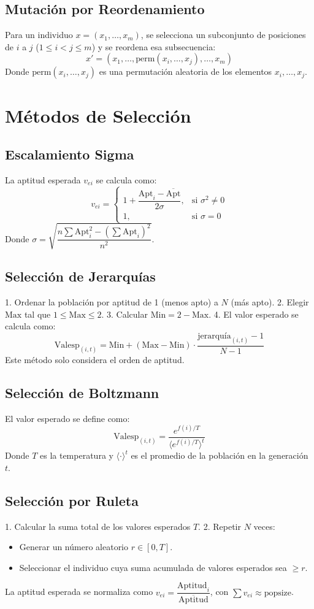 \documentclass[11pt, letterpaper]{article}
\begin{document}
	\subsection*{Mutación por Reordenamiento}
	Para un individuo $x = (x_1, \ldots, x_m)$, se selecciona un subconjunto de posiciones de $i$ a $j$ ($1 \leq i < j \leq m$) y se reordena esa subsecuencia:
	\[
	x' = (x_1, \ldots, \text{perm}(x_i, \ldots, x_j), \ldots, x_m)
	\]
	Donde $\text{perm}(x_i, \ldots, x_j)$ es una permutación aleatoria de los elementos $x_i, \ldots, x_j$.
	
	\section*{Métodos de Selección}
	
	\subsection*{Escalamiento Sigma}
	La aptitud esperada $v_{ei}$ se calcula como:
	\[
	v_{ei} =
	\begin{cases}
		1 + \dfrac{\text{Apt}_i - \overline{\text{Apt}}}{2\sigma}, & \text{si } \sigma^2 \neq 0 \\
		1, & \text{si } \sigma = 0
	\end{cases}
	\]
	Donde $\sigma = \sqrt{ \dfrac{n \sum \text{Apt}_i^2 - \left( \sum \text{Apt}_i \right)^2}{n^2} }$.
	
	\subsection*{Selección de Jerarquías}
	1. Ordenar la población por aptitud de 1 (menos apto) a $N$ (más apto).
	2. Elegir $\text{Max}$ tal que $1 \leq \text{Max} \leq 2$.
	3. Calcular $\text{Min} = 2 - \text{Max}$.
	4. El valor esperado se calcula como:
	\[
	\text{Valesp}_{(i,t)} = \text{Min} + (\text{Max} - \text{Min}) \cdot \dfrac{\text{jerarquía}_{(i,t)} - 1}{N - 1}
	\]
	Este método solo considera el orden de aptitud.
	
	\subsection*{Selección de Boltzmann}
	El valor esperado se define como:
	\[
	\text{Valesp}_{(i,t)} = \dfrac{e^{f(i)/T}}{ \langle e^{f(i)/T} \rangle^t }
	\]
	Donde $T$ es la temperatura y $\langle \cdot \rangle^t$ es el promedio de la población en la generación $t$.
	
	\subsection*{Selección por Ruleta}
	1. Calcular la suma total de los valores esperados $T$.
	2. Repetir $N$ veces:
	\begin{itemize}
		\item Generar un número aleatorio $r \in [0, T]$.
		\item Seleccionar el individuo cuya suma acumulada de valores esperados sea $\ge r$.
	\end{itemize}
	La aptitud esperada se normaliza como $v_{ei} = \dfrac{\text{Aptitud}_i}{\overline{\text{Aptitud}}}$, con $\sum v_{ei} \approx \text{popsize}$.
	
\end{document}
